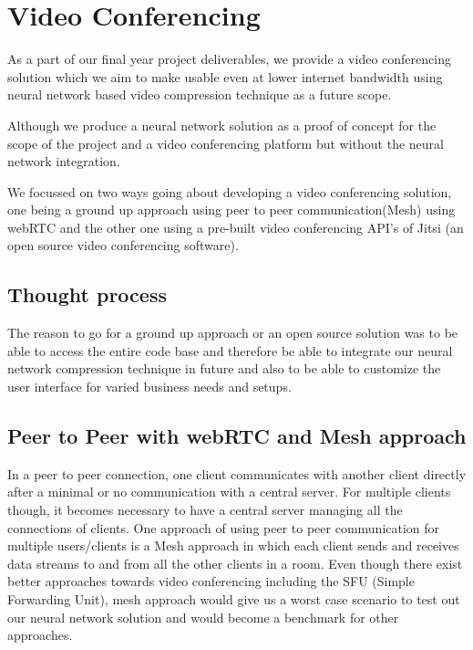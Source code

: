 \section{Video Conferencing}
As a part of our final year project deliverables, we provide a video conferencing solution which we aim to make usable even 
at lower internet bandwidth using neural network based video compression technique as a future scope.


Although we produce a neural network solution as a proof of concept for the scope of the project and a video 
conferencing platform but without the neural network integration.

We focussed on two ways going about developing a video conferencing solution, one being a ground up approach using peer 
to peer communication(Mesh) using webRTC and the other one using a pre-built video conferencing API’s of Jitsi 
(an open source video conferencing software).


\subsection{Thought process}

The reason to go for a ground up approach or an open source solution was to be able to access the entire code 
base and therefore be able to integrate our neural network compression technique in future and also to be able to
customize the user interface for varied business needs and setups.

\subsection{ Peer to Peer with webRTC and Mesh approach}
In a peer to peer connection, one client communicates with another client directly after a minimal or no communication with a central server.
For multiple clients though, it becomes necessary to have a central server managing all the connections of clients.
One approach of using peer to peer communication for multiple users/clients is a Mesh approach in which each client sends and 
receives data streams to and from all the other clients in a room.
Even though there exist better approaches towards video conferencing including the SFU (Simple Forwarding Unit), 
mesh approach would give us a worst case scenario to test out our neural network solution and would become a benchmark for other approaches.

